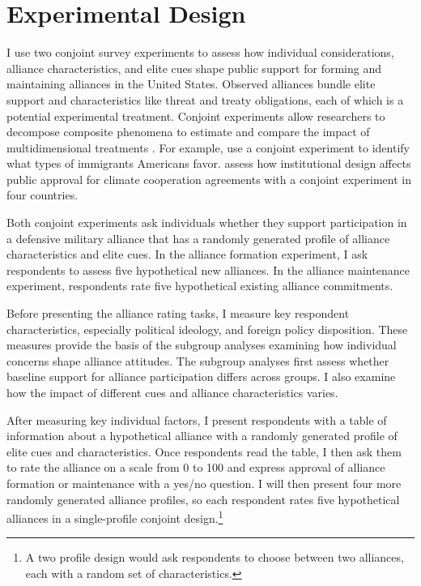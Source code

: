 \documentclass[12pt]{article}
\begin{document}
\section{Experimental Design}


I use two conjoint survey experiments to assess how individual considerations, alliance characteristics, and elite cues shape public support for forming and maintaining alliances in the United States. 
Observed alliances bundle elite support and characteristics like threat and treaty obligations, each of which is a potential experimental treatment.  
Conjoint experiments allow researchers to decompose composite phenomena to estimate and compare the impact of multidimensional treatments \citep{Hainmuelleretal2014}. 
For example, \citet{HainmuellerHopkins2015} use a conjoint experiment to identify what types of immigrants Americans favor. 
\citet{BechtelScheve2013} assess how institutional design affects public approval for climate cooperation agreements with a conjoint experiment in four countries. 


Both conjoint experiments ask individuals whether they support participation in a defensive military alliance that has a randomly generated profile of alliance characteristics and elite cues. 
In the alliance formation experiment, I ask respondents to assess five hypothetical new alliances. 
In the alliance maintenance experiment, respondents rate five hypothetical existing alliance commitments.


Before presenting the alliance rating tasks, I measure key respondent characteristics, especially political ideology, and foreign policy disposition.  
These measures provide the basis of the subgroup analyses examining how individual concerns shape alliance attitudes. 
The subgroup analyses first assess whether baseline support for alliance participation differs across groups.
I also examine how the impact of different cues and alliance characteristics varies.


After measuring key individual factors, I present respondents with a table of information about a hypothetical alliance with a randomly generated profile of elite cues and characteristics.
Once respondents read the table, I then ask them to rate the alliance on a scale from 0 to 100 and express approval of alliance formation or maintenance with a yes/no question. 
I will then present four more randomly generated alliance profiles, so each respondent rates five hypothetical alliances in a single-profile conjoint design.\footnote{A two profile design would ask respondents to choose between two alliances, each with a random set of characteristics.} 
\end{document}
